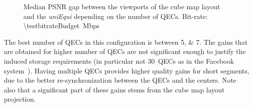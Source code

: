 \begin{figure}
\centering

\caption{Median \acs{PSNR} gap between the viewports of the cube map layout and the \textit{uniEqui} depending
on the number of \acp{QEC}.
Bit-rate: \SI{\testbitrateBudget}{\mega bps}}
\label{fig:QEC}
\end{figure}

The best number of \acp{QEC} in this configuration is between
\numlist{5;7}. The gains that are obtained for higher number of
\acp{QEC} are not significant enough to justify the induced storage
requirements (in particular not $30$~\acp{QEC} as in the Facebook
system~\cite{facebook}). Having multiple  \acp{QEC} provides higher
quality gains for short segments, due to the better re-synchronization
between the \acp{QEC} and the \FoV{} centers. Note also that a
significant part of these gains stems from the cube map layout
projection.
